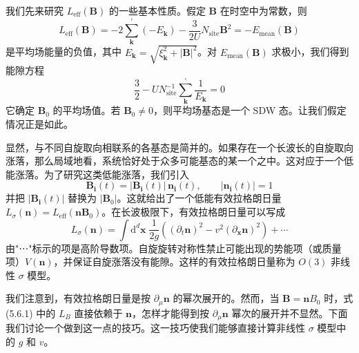 我们先来研究 $L_{\mathrm{eff}}(\pmb{B})$ 的一些基本性质。假定 $\pmb{B}$ 在时空中为常数，则
\begin{equation*}
L_{\mathrm{eff}}(\pmb{B})=-2\sum^{\prime}_{\pmb{k}}(-E_{\pmb{k}})-\frac{3}{2U}N_{\mathrm{site}}\pmb{B}^{2}=-E_{\mathrm{mean}}(\pmb{B})
\end{equation*}
是平均场能量的负值，其中 $E_{\pmb{k}}=\sqrt{\xi^{2}_{\pmb{k}}+|\pmb{B}|^{2}}$。对 $E_{\mathrm{mean}}(\pmb{B})$ 求极小，我们得到能隙方程
\begin{equation*}
\frac{3}{2}-UN^{-1}_{\mathrm{site}}\sum^{\prime}_{\pmb{k}}\frac{1}{E_{\pmb{k}}}=0 \tag{5.6.2}
\end{equation*}
它确定 $\pmb{B}_{0}$ 的平均场值。若 $\pmb{B}_{0}\neq 0$，则平均场基态是一个 SDW 态。让我们假定情况正是如此。

显然，与不同自旋取向相联系的各基态是简并的。如果存在一个长波长的自旋取向涨落，那么局域地看，系统恰好处于众多可能基态的某一个之中。这对应于一个低能涨落。为了研究这类低能涨落，我们引入
\begin{equation*}
\pmb{B}_{\pmb{i}}(t)=|\pmb{B}_{\pmb{i}}(t)|\,\pmb{n}_{\pmb{i}}(t),\qquad |\pmb{n}_{\pmb{i}}(t)|=1
\end{equation*}
并把 $|\pmb{B}_{\pmb{i}}(t)|$ 替换为 $|\pmb{B}_{0}|$。这就给出了一个低能有效拉格朗日量 $L_{\sigma}(\pmb{n})=L_{\mathrm{eff}}(\pmb{n}\pmb{B}_{0})$。在长波极限下，有效拉格朗日量可以写成
\begin{equation*}
L_{\sigma}(\pmb{n})=\int \mathrm{d}^{d}\pmb{x}\;\frac{1}{2g}\left((\partial_{t}\pmb{n})^{2}-v^{2}(\partial_{\pmb{x}}\pmb{n})^{2}\right)+\cdots \tag{5.6.3}
\end{equation*}
由"⋯"标示的项是高阶导数项。自旋旋转对称性禁止可能出现的势能项（或质量项）$V(\pmb{n})$，并保证自旋涨落没有能隙。这样的有效拉格朗日量称为 $O(3)$ 非线性 $\sigma$ 模型。

我们注意到，有效拉格朗日量是按 $\partial_{\mu}\pmb{n}$ 的幂次展开的。然而，当 $\pmb{B}=\pmb{n}B_{0}$ 时，式 (5.6.1) 中的 $L_{B}$ 直接依赖于 $\pmb{n}$，怎样才能得到按 $\partial_{\mu}\pmb{n}$ 幂次的展开并不显然。下面我们讨论一个做到这一点的技巧。这一技巧使我们能够直接计算非线性 $\sigma$ 模型中的 $g$ 和 $v$。

